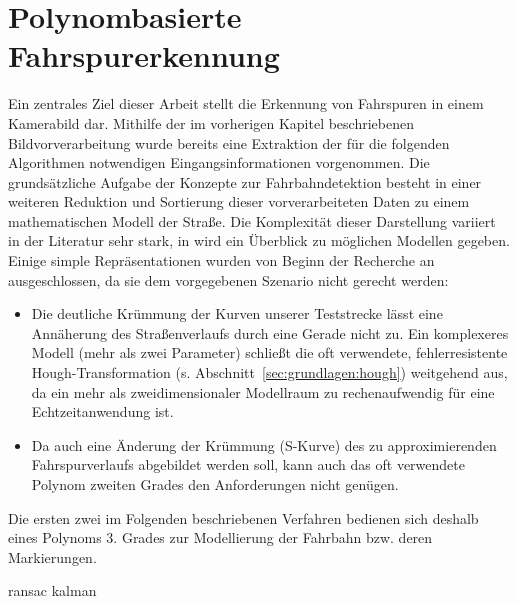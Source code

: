 \chapter{Polynombasierte Fahrspurerkennung \dcsecondauthorshort}
\label{cha:fahrspurerkennung}
Ein zentrales Ziel dieser Arbeit stellt die Erkennung von Fahrspuren in einem Kamerabild dar. Mithilfe der im vorherigen Kapitel beschriebenen Bildvorverarbeitung wurde bereits eine Extraktion der für die folgenden Algorithmen notwendigen Eingangsinformationen vorgenommen. Die grundsätzliche Aufgabe der Konzepte zur Fahrbahndetektion besteht in einer weiteren Reduktion und Sortierung dieser vorverarbeiteten Daten zu einem mathematischen Modell der Straße. Die Komplexität dieser Darstellung variiert in der Literatur sehr stark, in \autocite{naroteReviewRecentAdvances2018} wird ein Überblick zu möglichen Modellen gegeben. Einige simple Repräsentationen wurden von Beginn der Recherche an ausgeschlossen, da sie dem vorgegebenen Szenario nicht gerecht werden: 
\begin{itemize}
\item Die deutliche Krümmung der Kurven unserer Teststrecke lässt eine Annäherung des Straßenverlaufs durch eine Gerade nicht zu. Ein komplexeres Modell (mehr als zwei Parameter) schließt die oft verwendete, fehlerresistente Hough-Transformation (s. Abschnitt~\ref{sec:grundlagen:hough}) weitgehend aus, da ein mehr als zweidimensionaler Modellraum zu rechenaufwendig für eine Echtzeitanwendung ist. 
\item Da auch eine Änderung der Krümmung (S-Kurve) des zu approximierenden Fahrspurverlaufs abgebildet werden soll, kann auch das oft verwendete Polynom zweiten Grades den Anforderungen nicht genügen. 
\end{itemize}
Die ersten zwei im Folgenden beschriebenen Verfahren bedienen sich deshalb eines Polynoms 3. Grades zur Modellierung der Fahrbahn bzw. deren Markierungen. 

{ransac}
{kalman}
